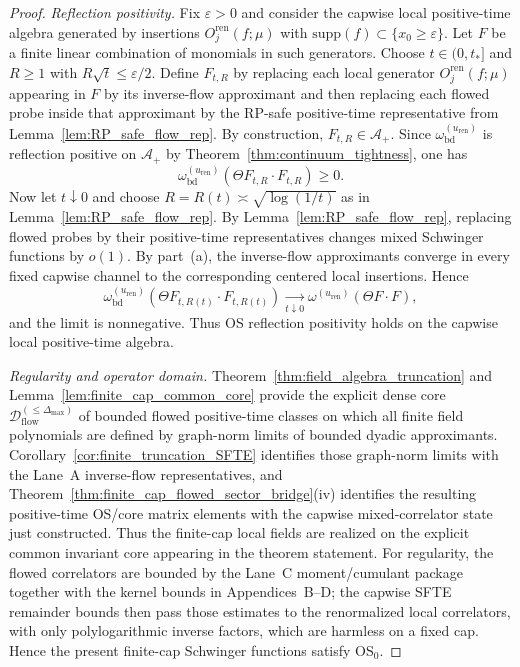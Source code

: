 \begin{proof}
\emph{Reflection positivity.}
Fix $\varepsilon>0$ and consider the capwise local positive-time algebra generated by insertions $O_j^{\mathrm{ren}}(f;\mu)$ with $\mathrm{supp}(f)\subset\{x_0\ge\varepsilon\}$.
Let $F$ be a finite linear combination of monomials in such generators.
Choose $t\in(0,t_\ast]$ and $R\ge 1$ with $R\sqrt t\le \varepsilon/2$.
Define $F_{t,R}$ by replacing each local generator $O_j^{\mathrm{ren}}(f;\mu)$ appearing in $F$ by its inverse-flow approximant and then replacing each flowed probe inside that approximant by the RP-safe positive-time representative from Lemma~\ref{lem:RP_safe_flow_rep}.
By construction, $F_{t,R}\in\mathcal A_+$.
Since $\omega_{\mathrm{bd}}^{(u_{\mathrm{ren}})}$ is reflection positive on $\mathcal A_+$ by Theorem~\ref{thm:continuum_tightness}, one has
\[
\omega_{\mathrm{bd}}^{(u_{\mathrm{ren}})}(\Theta F_{t,R}\cdot F_{t,R})\ge 0.
\]
Now let $t\downarrow 0$ and choose $R=R(t)\asymp\sqrt{\log(1/t)}$ as in Lemma~\ref{lem:RP_safe_flow_rep}.
By Lemma~\ref{lem:RP_safe_flow_rep}, replacing flowed probes by their positive-time representatives changes mixed Schwinger functions by $o(1)$.
By part~(a), the inverse-flow approximants converge in every fixed capwise channel to the corresponding centered local insertions.
Hence
\[
\omega_{\mathrm{bd}}^{(u_{\mathrm{ren}})}(\Theta F_{t,R(t)}\cdot F_{t,R(t)})
\xrightarrow[t\downarrow 0]{}
\omega^{(u_{\mathrm{ren}})}(\Theta F\cdot F),
\]
and the limit is nonnegative.
Thus OS reflection positivity holds on the capwise local positive-time algebra.

\emph{Regularity and operator domain.}
Theorem~\ref{thm:field_algebra_truncation} and Lemma~\ref{lem:finite_cap_common_core} provide the explicit dense core
$\mathcal D^{(\le \Delta_{\max})}_{\mathrm{flow}}$ of bounded flowed positive-time classes on which all finite field polynomials are defined by graph-norm limits of bounded dyadic approximants.
Corollary~\ref{cor:finite_truncation_SFTE} identifies those graph-norm limits with the Lane~A inverse-flow representatives, and
Theorem~\ref{thm:finite_cap_flowed_sector_bridge}(iv) identifies the resulting positive-time OS/core matrix elements with the capwise mixed-correlator state just constructed.
Thus the finite-cap local fields are realized on the explicit common invariant core appearing in the theorem statement.
For regularity, the flowed correlators are bounded by the Lane~C moment/cumulant package together with the kernel bounds in Appendices~B--D; the capwise SFTE remainder bounds then pass those estimates to the renormalized local correlators, with only polylogarithmic inverse factors, which are harmless on a fixed cap.
Hence the present finite-cap Schwinger functions satisfy OS$_0$.


\end{proof}
